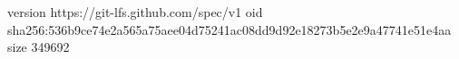 version https://git-lfs.github.com/spec/v1
oid sha256:536b9ce74e2a565a75aee04d75241ac08dd9d92e18273b5e2e9a47741e51e4aa
size 349692
